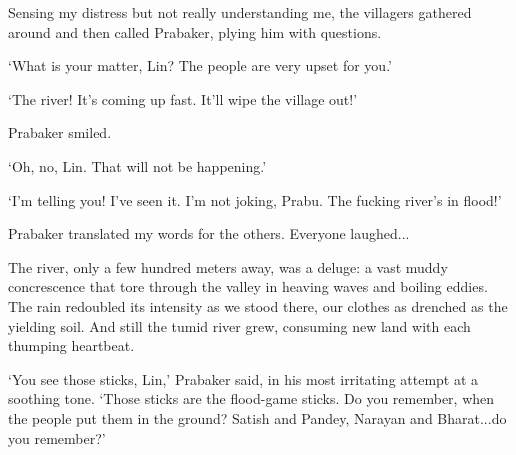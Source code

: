 {	Sensing my distress but not really understanding me, the villagers gathered around and then called Prabaker, plying him with questions.
	
	`What is your matter, Lin? The people are very upset for you.'
	
	`The river! It's coming up fast. It'll wipe the village out!'
	
	Prabaker smiled.
	
	`Oh, no, Lin. That will not be happening.'
	
	`I'm telling you! I've seen it. I'm not joking, Prabu. The fucking river's in flood!'
	
	Prabaker translated my words for the others. Everyone laughed...
	
%	
	
	The river, only a few hundred meters away, was a deluge: a vast muddy concrescence that tore through the valley in heaving waves and boiling eddies. The rain redoubled its intensity as we stood there, our clothes as drenched as the yielding soil. And still the tumid river grew, consuming new land with each thumping heartbeat.
	
	`You see those sticks, Lin,' Prabaker said, in his most irritating attempt at a soothing tone. `Those sticks are the flood-game sticks. Do you remember, when the people put them in the ground? Satish and Pandey, Narayan and Bharat...do you remember?'
	
%	
%	
%	
	
}
